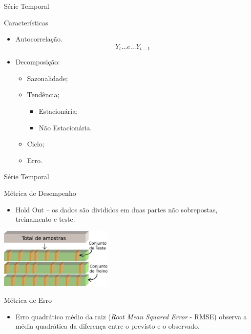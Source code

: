 \documentclass[aspectratio=169]{beamer}
\begin{document}
\begin{frame}{Série Temporal}
\begin{block}{Características}
        \begin{itemize}
            \item Autocorrelação.
            \begin{equation}
            Y_{t} \dots e \dots Y_{t - 1}
            \end{equation}
            \item Decomposição:
                \begin{itemize}[triangle]
                    \item Sazonalidade;
                    \item Tendência;
                        \begin{itemize}[square]\small
                            \item Estacionária;
                            \item Não Estacionária.
                        \end{itemize}
                    \item Ciclo;
                    \item Erro.
                \end{itemize}
        \end{itemize}
        \end{block}
\end{frame}


\begin{frame}{Série Temporal}
\vspace{-0.3cm}
\begin{block}{Métrica de Desempenho}
    \begin{itemize}
        \item Hold Out -- os dados são divididos em duas partes não sobrepostas, treinamento e teste.
        \end{itemize}
    
\end{block}
    \centering
\includegraphics[width=0.42\textwidth,angle=0]{holdout.pdf}\vspace{-0.1cm}
\begin{block}{Métrica de Erro}
    \begin{itemize}
        \item Erro quadrático médio da raiz (\textit{Root Mean Squared Error} - RMSE) observa a média quadrática da diferença entre o previsto e o observado.
        \end{itemize}
    
\end{block}
\end{frame}
\end{document}
